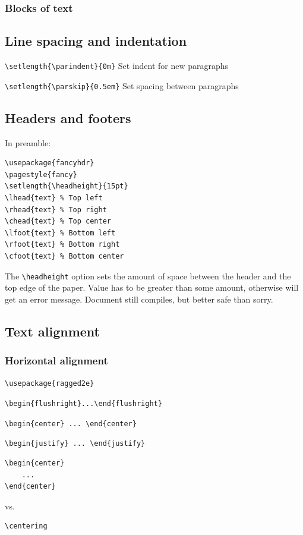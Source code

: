 \documentclass{article}
\begin{document}
\subsubsection{Blocks of text}

\subsection{Line spacing and indentation}
\verb|\setlength{\parindent}{0m}| Set indent for new paragraphs\par
\verb|\setlength{\parskip}{0.5em}| Set spacing between paragraphs

\subsection{Headers and footers}
In preamble:
\begin{verbatim}
\usepackage{fancyhdr}
\pagestyle{fancy}
\setlength{\headheight}{15pt}
\lhead{text} % Top left
\rhead{text} % Top right
\chead{text} % Top center
\lfoot{text} % Bottom left
\rfoot{text} % Bottom right
\cfoot{text} % Bottom center
\end{verbatim}

The \verb|\headheight| option sets the amount of space between the
header and the top edge of the paper. Value has to be greater than
some amount, otherwise will get an error message. Document still
compiles, but better safe than sorry.

\subsection{Text alignment}
\subsubsection{Horizontal alignment}
\verb|\usepackage{ragged2e}|
\begin{itemize*}
    \item \verb|\begin{flushright}...\end{flushright}|
    \item \verb|\begin{center} ... \end{center}|
    \item \verb|\begin{justify} ... \end{justify}|
\end{itemize*}

\begin{verbatim}
\begin{center}
    ...
\end{center}
\end{verbatim}
vs.
\begin{verbatim}
\centering
\end{verbatim}
\end{document}
